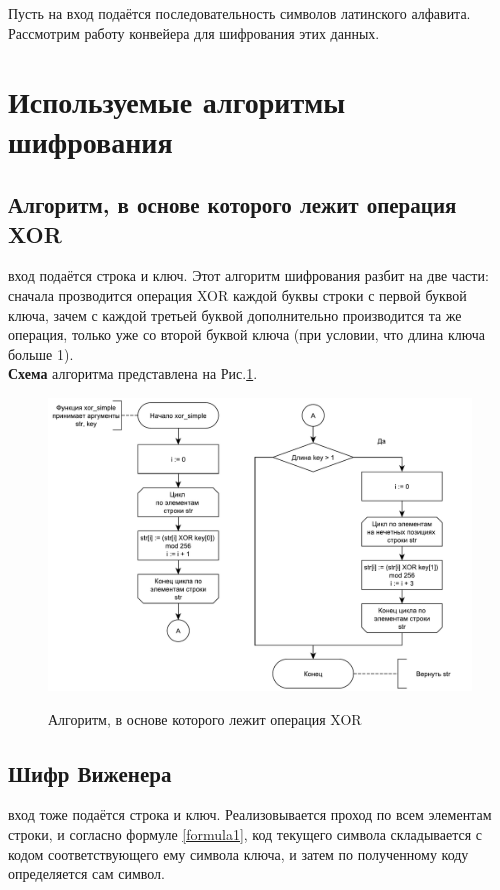 Пусть на вход подаётся последовательность символов латинского алфавита. Рассмотрим работу конвейера для шифрования этих данных.

\section{Используемые алгоритмы шифрования}

\subsection{Алгоритм, в основе которого лежит операция XOR}
 вход подаётся строка и ключ. Этот алгоритм шифрования разбит на две части: сначала прозводится операция XOR каждой буквы строки с первой буквой ключа, зачем с каждой третьей буквой дополнительно производится та же операция, только уже со второй буквой ключа (при условии, что длина ключа больше 1).\\

\textbf{Схема} алгоритма представлена на Рис.\ref{fig1:image}.\\
\begin{figure}[h]
	\begin{center}
		{\includegraphics[scale = 0.65]{schemes/xor}}
		\caption{Алгоритм, в основе которого лежит операция XOR}
		\label{fig1:image}
	\end{center}
\end{figure}

\newpage
 
\subsection{Шифр Виженера}
 вход тоже подаётся строка и ключ. Реализовывается проход по всем элементам строки, и согласно формуле \ref{formula1}, код текущего символа складывается с кодом соответствующего ему символа ключа, и затем по полученному коду определяется сам символ.\\

